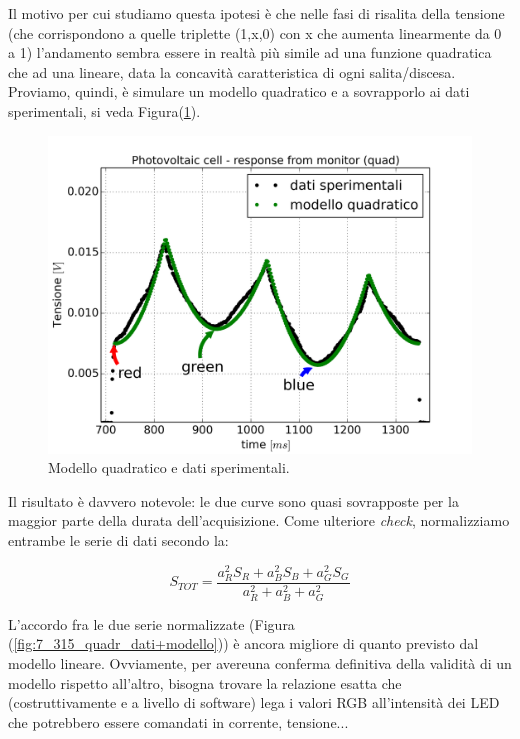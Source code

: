 \documentclass[journal, a4paper]{IEEEtran}
\begin{document}
Il motivo per cui studiamo questa ipotesi è che nelle fasi di risalita della tensione (che corrispondono a quelle triplette (1,x,0) con x che aumenta linearmente da 0 a 1) l'andamento sembra essere in realtà più simile ad una funzione quadratica che ad una lineare, data la concavità caratteristica di ogni salita/discesa. Proviamo, quindi, è simulare un modello quadratico e a sovrapporlo ai dati sperimentali, si veda Figura(\ref{fig:6_315_quadr}).

\begin{figure}
\centering
\includegraphics[width=0.8\linewidth]{./relaz_colori/6_315_quadr}
\caption{Modello quadratico e dati sperimentali.}
\label{fig:6_315_quadr}
\end{figure}



Il risultato è davvero notevole: le due curve sono quasi sovrapposte per la maggior parte della durata dell'acquisizione. Come ulteriore \textit{check}, normalizziamo entrambe le serie di dati secondo la:

\begin{equation}
S_{TOT} = \frac{a_R^2 S_R + a_B^2 S_B + a_G^2 S_G}{a_R^2 + a_B^2 + a_G^2}
\end{equation}

L'accordo fra le due serie normalizzate (Figura (\ref{fig:7_315_quadr_dati+modello})) è ancora migliore di quanto previsto dal modello lineare. Ovviamente, per avereuna conferma definitiva della validità di un modello rispetto all'altro, bisogna trovare la relazione esatta che (costruttivamente e a livello di software) lega i valori RGB all'intensità dei LED che potrebbero essere comandati in corrente, tensione...
\end{document}
